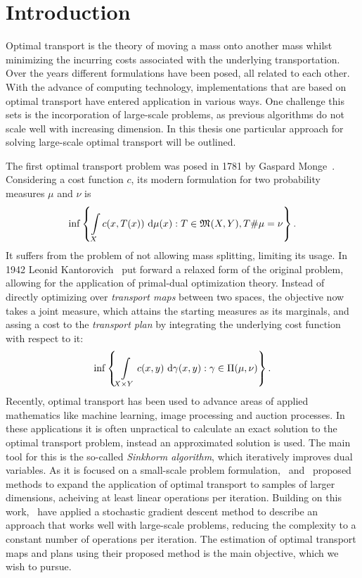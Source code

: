 \chapter*{Introduction}

Optimal transport is the theory of moving a mass onto another mass whilst minimizing the incurring costs associated with the underlying transportation. Over the years different formulations have been posed, all related to each other. With the advance of computing technology, implementations that are based on optimal transport have entered application in various ways. One challenge this sets is the incorporation of large-scale problems, as previous algorithms do not scale well with increasing dimension. In this thesis one particular approach for solving large-scale optimal transport will be outlined.

The first optimal transport problem was posed in 1781 by Gaspard Monge\ \cite{Mon1781}. Considering a cost function $c$, its modern formulation for two probability measures $\mu$ and $\nu$ is
\[ \inf \left\{ \int\limits_X c(x, T(x))~\Dx{\mu} : T \in \MF{X}{Y}, \push{\mu} = \nu \right\}. \]
It suffers from the problem of not allowing mass splitting, limiting its usage. In 1942 Leonid Kantorovich\ \cite{Kan1942} put forward a relaxed form of the original problem, allowing for the application of primal-dual optimization theory. Instead of directly optimizing over \textit{transport maps} between two spaces, the objective now takes a joint measure, which attains the starting measures as its marginals, and assing a cost to the \textit{transport plan} by integrating the underlying cost function with respect to it:
\[ \inf \left\{ \int\limits_{X \times Y} c(x, y)~\Dx[x, y]{\gamma} : \gamma \in \TP{\mu}{\nu} \right\}. \]
Recently, optimal transport has been used to advance areas of applied mathematics like machine learning, image processing and auction processes. In these applications it is often unpractical to calculate an exact solution to the optimal transport problem, instead an approximated solution is used. The main tool for this is the so-called \textit{Sinkhorm algorithm}, which iteratively improves dual variables. As it is focused on a small-scale problem formulation,\ \cite{Gene2016} and\ \cite{Arjo2017} proposed methods to expand the application of optimal transport to samples of larger dimensions, acheiving at least linear operations per iteration. Building on this work,\ \cite{Seg2018} have applied a stochastic gradient descent method to describe an approach that works well with large-scale problems, reducing the complexity to a constant number of operations per iteration. The estimation of optimal transport maps and plans using their proposed method is the main objective, which we wish to pursue.


